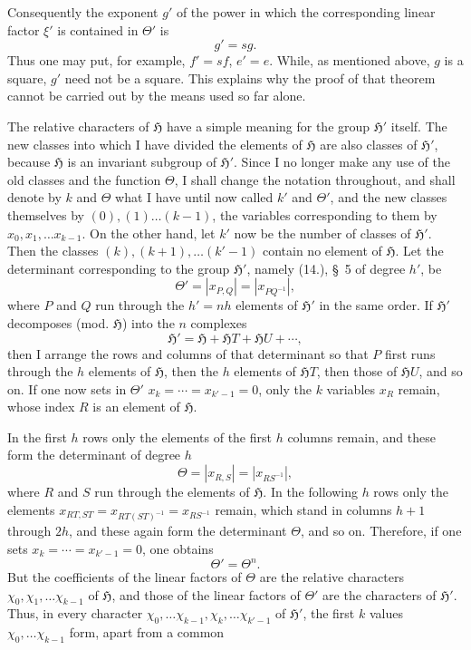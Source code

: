 \documentclass[11pt]{article}
\newcommand{\grp}{\mathfrak{H}}
\begin{document}
Consequently the exponent $g'$ of the power in which the corresponding linear factor $\xi'$ is contained in $\Theta'$ is
\begin{equation*}\tag{9.}
g'=sg.
\end{equation*}
Thus one may put, for example, $f'=sf$, $e'=e$. While, as mentioned above, $g$ is a square, $g'$ need not be a square. This explains why the proof of that theorem cannot be carried out by the means used so far alone.

The relative characters of $\grp$ have a simple meaning for the group $\grp'$ itself. The new classes into which I have divided the elements of $\grp$ are also classes of $\grp'$, because $\grp$ is an invariant subgroup of $\grp'$. Since I no longer make any use of the old classes and the function $\Theta$, I shall change the notation throughout, and shall denote by $k$ and $\Theta$ what I have until now called $k'$ and $\Theta'$, and the new classes themselves by $(0),(1)\ldots(k-1)$, the variables corresponding to them by $x_0,x_1,\ldots x_{k-1}$. On the other hand, let $k'$ now be the number of classes of $\grp'$. Then the classes $(k),(k+1),\ldots(k'-1)$ contain no element of $\grp$. Let the determinant corresponding to the group $\grp'$, namely (14.), \S~5 of degree $h'$, be
\[
\Theta'=\left|x_{P,Q}\right|=\left|x_{PQ^{-1}}\right|,
\]
where $P$ and $Q$ run through the $h'=nh$ elements of $\grp'$ in the same order. If $\grp'$ decomposes (mod. $\grp$) into the $n$ complexes
\[
\grp'=\grp+\grp T+\grp U+\cdots,
\]
then I arrange the rows and columns of that determinant so that $P$ first runs through the $h$ elements of $\grp$, then the $h$ elements of $\grp T$, then those of $\grp U$, and so on. If one now sets in $\Theta'$ $x_k=\cdots=x_{k'-1}=0$, only the $k$ variables $x_R$ remain, whose index $R$ is an element of $\grp$.

In the first $h$ rows only the elements of the first $h$ columns remain, and these form the determinant of degree $h$
\[
\Theta=\left|x_{R,S}\right|=\left|x_{RS^{-1}}\right|,
\]
where $R$ and $S$ run through the elements of $\grp$. In the following $h$ rows only the elements $x_{RT,ST}=x_{RT(ST)^{-1}}=x_{RS^{-1}}$ remain, which stand in columns $h+1$ through $2h$, and these again form the determinant $\Theta$, and so on. Therefore, if one sets $x_k=\cdots=x_{k'-1}=0$, one obtains
\begin{equation*}\tag{10.}
\Theta'=\Theta^n.
\end{equation*}
But the coefficients of the linear factors of $\Theta$ are the relative characters $\chi_0,\chi_1,\ldots \chi_{k-1}$ of $\grp$, and those of the linear factors of $\Theta'$ are the characters of $\grp'$. Thus, in every character $\chi_0,\ldots \chi_{k-1},\chi_k,\ldots \chi_{k'-1}$ of $\grp'$, the first $k$ values $\chi_0,\ldots \chi_{k-1}$ form, apart from a common
\end{document}
